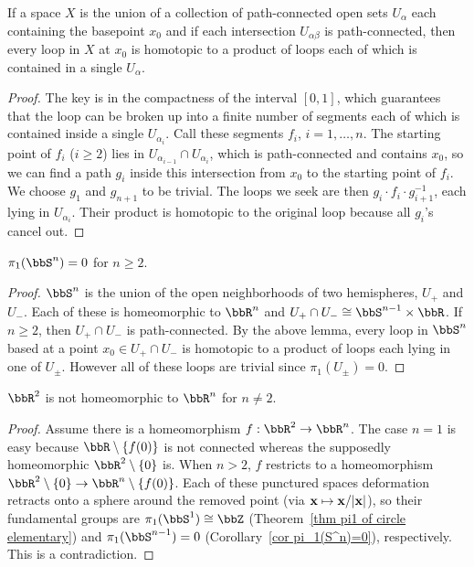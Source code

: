 \begin{lem}\label{lem product of loops}
    If a space $X$ is the union of a collection of path-connected open sets $U_\alpha$ each containing the basepoint $x_0$ and if each intersection $U_{\alpha\beta}$ is path-connected, then every loop in $X$ at $x_0$ is homotopic to a product of loops each of which is contained in a single $U_\alpha$.
\end{lem}
\begin{proof}
    The key is in the compactness of the interval $[0,1]$, which guarantees that the loop can be broken up into a finite number of segments each of which is contained inside a single $U_{\alpha_i}$. Call these segments $f_i$, $i=1,\ldots,n$. The starting point of $f_i$ ($i\geq 2$) lies in $U_{\alpha_{i-1}}\cap U_{\alpha_i}$, which is path-connected and contains $x_0$, so we can find a path $g_i$ inside this intersection from $x_0$ to the starting point of $f_i$. We choose $g_1$ and $g_{n+1}$ to be trivial. The loops we seek are then $g_i\cdot f_i\cdot g_{i+1}^{-1}$, each lying in $U_{\alpha_i}$. Their product is homotopic to the original loop because all $g_i$'s cancel out.
\end{proof}
\begin{cor}\label{cor pi_1(S^n)=0}
    $\pi_1(\bbS^n)=0$ for $n\geq 2$.
\end{cor}
\begin{proof}
    $\bbS^n$ is the union of the open neighborhoods of two hemispheres, $U_+$ and $U_-$. Each of these is homeomorphic to $\bbR^n$ and $U_+\cap U_-\cong \bbS^{n-1}\times \bbR $. If $n\geq 2$, then $U_+\cap U_-$ is path-connected. By the above lemma, every loop in $\bbS^n$ based at a point $x_0\in U_+\cap U_-$ is homotopic to a product of loops each lying in one of $U_\pm$. However all of these loops are trivial since $\pi_1(U_\pm)=0$.
\end{proof}
\begin{cor}
    $\bbR^2$ is not homeomorphic to $\bbR^n$ for $n\neq 2$.
\end{cor}
\begin{proof}
    Assume there is a homeomorphism $f:\bbR^2\to \bbR^n$. The case $n=1$ is easy because $\bbR \setminus\{f(0)\}$ is not connected whereas the supposedly homeomorphic $\bbR^2\setminus\{0\}$ is. When $n>2$, $f$ restricts to a homeomorphism $\bbR^2\setminus\{0\}\to\bbR^n\setminus\{f(0)\}$. Each of these punctured spaces deformation retracts onto a sphere around the removed point (via $\bf{x}\mapsto \bf{x}/\lvert \bf{x}\rvert$), so their fundamental groups are $\pi_1(\bbS^1)\cong\bbZ$ (Theorem~\ref{thm pi1 of circle elementary}) and $\pi_1(\bbS^{n-1})=0$ (Corollary~\ref{cor pi_1(S^n)=0}), respectively. This is a contradiction.
\end{proof}

